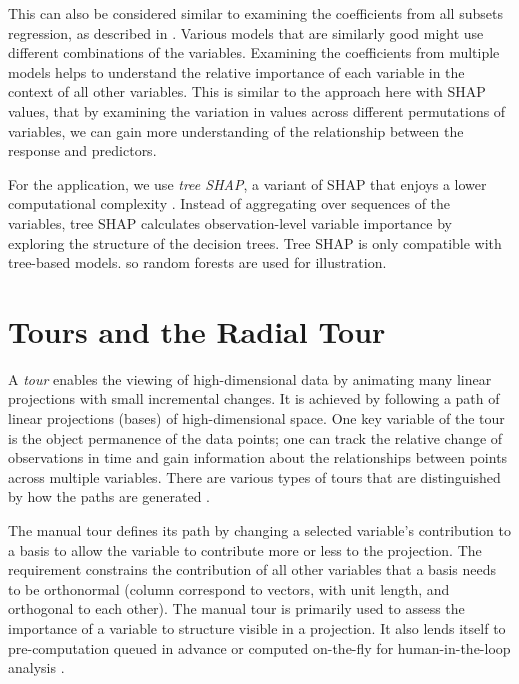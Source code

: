 \documentclass[
]{jss}
\begin{document}
This can also be considered similar to examining the coefficients from
all subsets regression, as described in
\citet{wickham_visualizing_2015}. Various models that are similarly good
might use different combinations of the variables. Examining the
coefficients from multiple models helps to understand the relative
importance of each variable in the context of all other variables. This
is similar to the approach here with SHAP values, that by examining the
variation in values across different permutations of variables, we can
gain more understanding of the relationship between the response and
predictors.

For the application, we use \emph{tree SHAP}, a variant of SHAP that
enjoys a lower computational complexity
\citep{lundberg_consistent_2018}. Instead of aggregating over sequences
of the variables, tree SHAP calculates observation-level variable
importance by exploring the structure of the decision trees. Tree SHAP
is only compatible with tree-based models. so random forests are used
for illustration.

\hypertarget{sec:tour}{%
\section{Tours and the Radial Tour}\label{sec:tour}}

A \emph{tour} enables the viewing of high-dimensional data by animating
many linear projections with small incremental changes. It is achieved
by following a path of linear projections (bases) of high-dimensional
space. One key variable of the tour is the object permanence of the data
points; one can track the relative change of observations in time and
gain information about the relationships between points across multiple
variables. There are various types of tours that are distinguished by
how the paths are generated \citep{lee_state_2021, cook_grand_2008}.

The manual tour \citep{cook_manual_1997} defines its path by changing a
selected variable's contribution to a basis to allow the variable to
contribute more or less to the projection. The requirement constrains
the contribution of all other variables that a basis needs to be
orthonormal (column correspond to vectors, with unit length, and
orthogonal to each other). The manual tour is primarily used to assess
the importance of a variable to structure visible in a projection. It
also lends itself to pre-computation queued in advance or computed
on-the-fly for human-in-the-loop analysis
\citep{karwowski_international_2006}.
\end{document}
